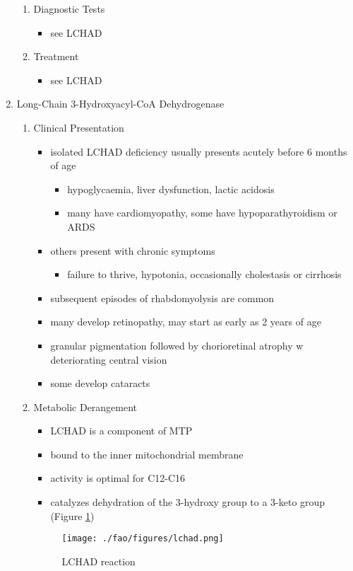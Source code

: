 \documentclass{scrartcl}
\begin{document}
\begin{enumerate}
\begin{enumerate}
\item Diagnostic Tests
\label{sec:orgf41f347}
\begin{itemize}
\item see LCHAD
\end{itemize}

\item Treatment
\label{sec:org36bd569}
\begin{itemize}
\item see LCHAD
\end{itemize}
\end{enumerate}

\item Long-Chain 3-Hydroxyacyl-CoA Dehydrogenase
\label{sec:orgd234be6}
\begin{enumerate}
\item Clinical Presentation
\label{sec:org4918eda}
\begin{itemize}
\item isolated LCHAD deficiency usually presents acutely before 6 months of age
\begin{itemize}
\item hypoglycaemia, liver dysfunction, lactic acidosis
\item many have cardiomyopathy, some have hypoparathyroidism or ARDS
\end{itemize}
\item others present with chronic symptoms
\begin{itemize}
\item failure to thrive, hypotonia, occasionally cholestasis or cirrhosis
\end{itemize}
\item subsequent episodes of rhabdomyolysis are common
\item many develop retinopathy, may start as early as 2 years of age
\item granular pigmentation followed by chorioretinal atrophy w deteriorating central vision
\item some develop cataracts
\end{itemize}
\item Metabolic Derangement
\label{sec:org2079a42}
\begin{itemize}
\item LCHAD is a component of MTP
\item bound to the inner mitochondrial membrane
\item activity is optimal for C12-C16
\item catalyzes dehydration of the 3-hydroxy group to a 3-keto group
(Figure \ref{fig:orgee04c55})
\end{itemize}
\begin{figure}[htbp]
\centering
\texttt{[image: ./fao/figures/lchad.png]}
\caption{\label{fig:orgee04c55}
LCHAD reaction}
\end{figure}


\end{enumerate}
\end{enumerate}
\end{document}
